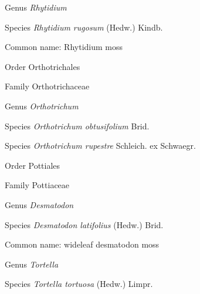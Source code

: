 \documentclass[9pt, article]{memoir}
\begin{document}
\begin{multicols}{2}
\vspace{6pt}\noindent\hspace{30pt}Genus \textit{Rhytidium}


\vspace{6pt}\noindent\hspace{36pt}Species \textit{Rhytidium rugosum} (Hedw.) Kindb.


Common name: Rhytidium moss

\vspace{6pt}\noindent\hspace{18pt}Order Orthotrichales


\vspace{6pt}\noindent\hspace{24pt}Family Orthotrichaceae


\vspace{6pt}\noindent\hspace{30pt}Genus \textit{Orthotrichum}


\vspace{6pt}\noindent\hspace{36pt}Species \textit{Orthotrichum obtusifolium} Brid.


\vspace{6pt}\noindent\hspace{36pt}Species \textit{Orthotrichum rupestre} Schleich. ex Schwaegr.


\vspace{6pt}\noindent\hspace{18pt}Order Pottiales


\vspace{6pt}\noindent\hspace{24pt}Family Pottiaceae


\vspace{6pt}\noindent\hspace{30pt}Genus \textit{Desmatodon}


\vspace{6pt}\noindent\hspace{36pt}Species \textit{Desmatodon latifolius} (Hedw.) Brid.


Common name: wideleaf desmatodon moss

\vspace{6pt}\noindent\hspace{30pt}Genus \textit{Tortella}


\vspace{6pt}\noindent\hspace{36pt}Species \textit{Tortella tortuosa} (Hedw.) Limpr.



\end{multicols}
\end{document}
